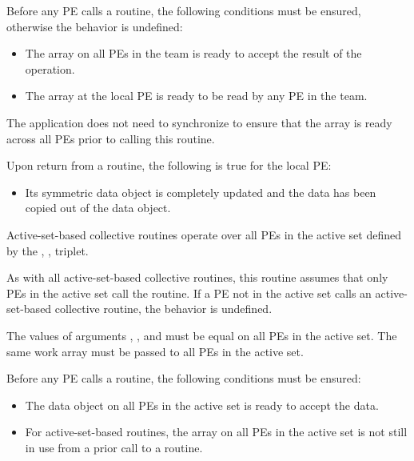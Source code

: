 \begin{apidefinition}
{    Before any \ac{PE} calls a  routine, the following
    conditions must be ensured, otherwise the behavior is undefined:
    \begin{itemize}
        \item The \dest{} array on all \acp{PE} in the team is ready to
            accept the result of the operation.
        \item The \source{} array at the local \ac{PE} is ready to be
            read by any \ac{PE} in the team.
    \end{itemize}
    The application does not need to synchronize to ensure that the \source{}
    array is ready across all \acp{PE} prior to calling this routine.

    Upon return from a  routine, the following is true for
    the local \ac{PE}:
    \begin{itemize}
        \item Its  symmetric data object is completely updated and the 
	data has been copied out of the  data object.
    \end{itemize}

\begin{DeprecateBlock}
    Active-set-based collective routines operate over all \acp{PE} in the active set
    defined by the , ,  triplet.

    As with all active-set-based collective routines,
    this routine assumes that only \acp{PE} in the active set call the routine.
    If a \ac{PE} not in the active set calls an
    active-set-based collective routine,
    the behavior is undefined.

    The values of arguments , ,
    and  must be equal on all \acp{PE} in the active set. The same
     work
    array must be passed to all \acp{PE} in the active set.

    Before any \ac{PE} calls a  routine,
    the following conditions must be ensured:

    \begin{itemize}
    	\item The  data object on all \acp{PE} in the active set is
    	ready to accept the  data.
    	\item For active-set-based routines, the  array
    	on all \acp{PE} in the active set is not still in use from a prior call
    	to a  routine.
    \end{itemize}


\end{DeprecateBlock}}
\end{apidefinition}
